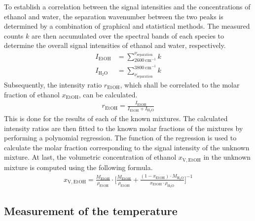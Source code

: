 To establish a correlation between the signal intensities and the concentrations of ethanol and water, the separation wavenumber between the two peaks is determined by a combination of graphical and statistical methods. The measured counts $k$ are then accumulated over the spectral bands of each species to determine the overall signal intensities of ethanol and water, respectively.
\begin{align}
    I_\mathrm{EtOH}&=\sum_{2600~\mathrm{cm^{-1}}}^{\nu_\mathrm{separation}} k \\[12pt]
    I_\mathrm{H_2O}&=\sum_{\nu_\mathrm{separation}}^{3800~\mathrm{cm^{-1}}} k
\end{align}
Subsequently, the intensity ratio $r_\mathrm{EtOH}$, which shall be correlated to the molar fraction of ethanol $x_\mathrm{EtOH}$, can be calculated.
\begin{align}
    r_\mathrm{EtOH}=\frac{I_\mathrm{EtOH}}{I_\mathrm{EtOH}+I_\mathrm{H_2O}}
\end{align}
This is done for the results of each of the known mixtures. The calculated intensity ratios are then fitted to the known molar fractions of the mixtures by performing a polynomial regression. The function of the regression is used to calculate the molar fraction corresponding to the signal intensity of the unknown mixture. At last, the volumetric concentration of ethanol $x_\mathrm{V,EtOH}$ in the unknown mixture is computed using the following formula.
\begin{align}
    x_\mathrm{V,EtOH}=\frac{M_\mathrm{EtOH}}{\rho_\mathrm{EtOH}} \cdot \bigg[ \frac{M_\mathrm{EtOH}}{\rho_\mathrm{EtOH}} + \frac{(1-x_\mathrm{EtOH}) \cdot M_\mathrm{H_2O}}{x_\mathrm{EtOH} \cdot \rho_\mathrm{H_2O}} \bigg]^{-1}
\end{align}

\subsection{Measurement of the temperature}


